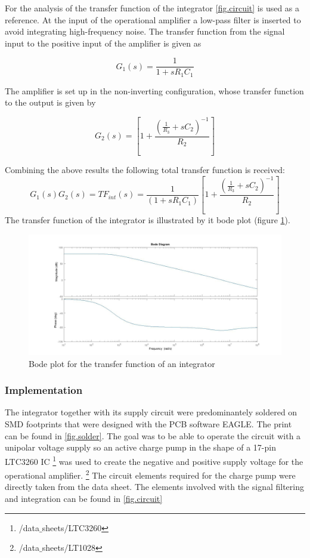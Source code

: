 For the analysis of the transfer function of the integrator \ref{fig.circuit} is used as a reference.
At the input of the operational amplifier a low-pass filter is inserted to avoid integrating high-frequency noise.
The transfer function from the signal input to the positive input of the amplifier is given as

\begin{equation}
  G_1(s)=\frac{1}{1+sR_1C_1}
\end{equation}

The amplifier is set up in the non-inverting configuration, whose transfer function to the output is given by

\begin{equation}
 G_2(s)=\left[1+\frac{\left(\frac{1}{R_3}+sC_2\right)^{-1}}{R_2}\right]
\end{equation}

Combining the above results the following total transfer function is received:
\begin{equation}
	G_1(s)G_2(s)=TF_{int}(s)=\frac{1}{(1+s R_1 C_1)}\left[1+\frac{\left(\frac{1}{R_3}+sC_2\right)^{-1}}{R_2}\right]
\end{equation}
The transfer function of the integrator is illustrated by it bode plot (figure \ref{fig.Bodeplot}). 

\begin{figure}[h!tb]
\includegraphics[width=\textwidth]{figures/Method/integrator/transferfunction_int.jpg}
\caption[Kurze Abbildungsbeschreibung]{Bode plot for the transfer function of an integrator}
\label{fig.Bodeplot}
\end{figure}

\subsubsection{Implementation}
The integrator together with its supply circuit were predominantely soldered on SMD footprints that were designed
with the PCB software EAGLE. The print can be found in \ref{fig.solder}.
The goal was to be able to operate the circuit with a unipolar voltage supply so an active charge pump in the 
shape of a 17-pin LTC3260 IC \footnote{/data$\_$sheets/LTC3260} was used to create the negative and positive supply voltage for the operational amplifier.
\footnote{/data$\_$sheets/LT1028}
The circuit elements required for the charge pump were directly taken from the data sheet. The elements involved with the signal 
filtering and integration can be found in \ref{fig.circuit}

